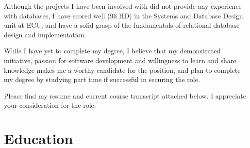 \documentclass[10pt,a4paper,sans]{moderncv}        %
\begin{document}
Although the projects I have been involved with did not provide any experience with databases, I have scored well (96 HD) in the Systems and Database Design unit at ECU, and have a solid grasp of the fundamentals of relational database design and implementation.

While I have yet to complete my degree, I believe that my demonstrated initiative, passion for software development and willingness to learn and share knowledge makes me a worthy candidate for the position, and plan to complete my degree by studying part time if successful in securing the role.


Please find my resume and current course transcript attached below. I appreciate your consideration for the role.


\makeletterclosing

\clearpage

\makecvtitle

\section{Education}

\end{document}
